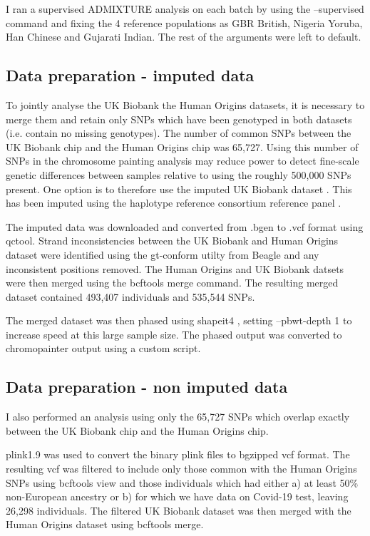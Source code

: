 I ran a supervised ADMIXTURE analysis on each batch by using the --supervised command and fixing the 4 reference populations as GBR British, Nigeria Yoruba, Han Chinese and Gujarati Indian. The rest of the arguments were left to default.

\subsection{Data preparation - imputed data}

To jointly analyse the UK Biobank the Human Origins datasets, it is necessary to merge them and retain only SNPs which have been genotyped in both datasets (i.e. contain no missing genotypes). The number of common SNPs between the UK Biobank chip and the Human Origins chip was 65,727. Using this number of SNPs in the chromosome painting analysis may reduce power to detect fine-scale genetic differences between samples relative to using the roughly 500,000 SNPs present. One option is to therefore use the imputed UK Biobank dataset \cite{bycroft2018uk}. This has been imputed using the haplotype reference consortium reference panel \cite{mccarthy2016reference}.

The imputed data was downloaded and converted from .bgen to .vcf format using qctool. Strand inconsistencies between the UK Biobank and Human Origins dataset were identified using the gt-conform utilty from Beagle and any inconsistent positions removed. The Human Origins and UK Biobank datsets were then merged using the bcftools merge command. The resulting merged dataset contained 493,407 individuals and 535,544 SNPs.

The merged dataset was then phased using shapeit4 \cite{delaneau2018integrative}, setting --pbwt-depth 1 to increase speed at this large sample size. The phased output was converted to chromopainter output using a custom script.

\subsection{Data preparation - non imputed data}

I also performed an analysis using only the 65,727 SNPs which overlap exactly between the UK Biobank chip and the Human Origins chip. 

plink1.9 \cite{purcell2007plink} was used to convert the binary plink files to bgzipped vcf format. The resulting vcf was filtered to include only those common with the Human Origins SNPs using bcftools view \cite{li2009sequence} and those individuals which had either a) at least 50\% non-European ancestry or b) for which we have data on Covid-19 test, leaving 26,298 individuals. The filtered UK Biobank dataset was then merged with the Human Origins dataset using bcftools merge.

